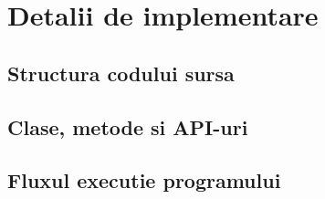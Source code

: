  \chapter{Detalii de implementare}
\label{cap:implementare}

%
%
%
%
%
%
%  
%    
%    
\section{Structura codului sursa}
\section{Clase, metode si API-uri}
\section{Fluxul executie programului}